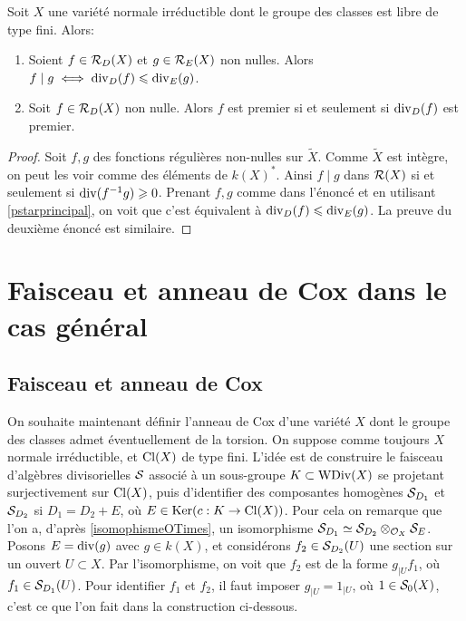 \begin{prop}\label{divisibilitePropsFreeCox}
Soit $X$ une variété normale irréductible dont le groupe des classes est libre de type fini.  Alors:
\begin{enumerate}
\item Soient $f\in \mathcal{R}_D(X)$ et $g\in \mathcal{R}_E(X)$ non nulles. Alors $f\mid g\iff \operatorname{div}_D(f)\leqslant\operatorname{div}_E(g)$.
\item Soit $f\in \mathcal{R}_D(X)$ non nulle. Alors $f$ est premier si et seulement si $\operatorname{div}_D(f)$ est premier.
\end{enumerate}
\end{prop}
\begin{proof}
Soit $f,g$ des fonctions régulières non-nulles sur $\widetilde{X}$. Comme $\widetilde{X}$ est intègre, on peut les voir comme des éléments de $k(X)^*$. Ainsi $f\mid g$ dans $\mathcal{R}(X)$ si et seulement si $\operatorname{div}(f^{-1}g)\geqslant 0$. Prenant $f,g$ comme dans l'énoncé et en utilisant \ref{pstarprincipal}, on voit que c'est équivalent à $\operatorname{div}_D(f)\leqslant\operatorname{div}_E(g)$. La preuve du deuxième énoncé est similaire.
\end{proof}

\section{Faisceau et anneau de Cox dans le cas général}

\subsection{Faisceau et anneau de Cox}

On souhaite maintenant définir l'anneau de Cox d'une variété $X$ dont le groupe des classes admet éventuellement de la torsion. On suppose comme toujours $X$ normale irréductible, et $\operatorname{Cl}(X)$ de type fini. L'idée est de construire le faisceau d'algèbres divisorielles $\mathcal{S}$ associé à un sous-groupe $K\subset \operatorname{WDiv}(X)$ se projetant surjectivement sur $\operatorname{Cl}(X)$, puis d'identifier des composantes homogènes $\mathcal{S}_{D_1}$ et  $\mathcal{S}_{D_2}$ si $D_1=D_2+E$, où $E\in \operatorname{Ker} (c:K\rightarrow \operatorname{Cl}(X))$. Pour cela on remarque que l'on a, d'après \ref{isomophismeOTimes}, un isomorphisme $\mathcal{S}_{D_1}\simeq \mathcal{S}_{D_2}\otimes_{\mathcal{O}_X}\mathcal{S}_E$. Posons $E=\operatorname{div}(g)$ avec $g\in k(X)$, et considérons $f_2\in \mathcal{S}_{D_2}(U)$ une section sur un ouvert $U\subset X$. Par l'isomorphisme, on voit que $f_2$ est de la forme $g_{|U}f_1$, où $f_1\in \mathcal{S}_{D_1}(U)$. Pour identifier $f_1$ et $f_2$, il faut imposer $g_{|U}=1_{|U}$, où $1\in\mathcal{S}_0(X)$, c'est ce que l'on fait dans la construction ci-dessous.

